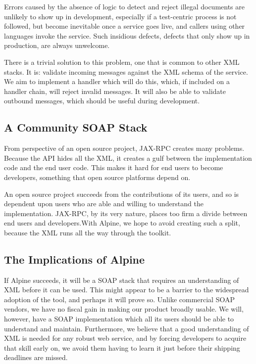 Errors caused by the absence of logic to detect and reject illegal
documents are unlikely to show up in development, especially if a
test-centric process is not followed, but become inevitable once a
service goes live, and callers using other languages invoke the
service. Such insidious defects, defects that only show up in
production, are always unwelcome.

There is a trivial solution to this problem, one that is common to
other XML stacks. It is: validate incoming messages against the XML
schema of the service.  We aim to implement a handler which will do
this, which, if included on a handler chain, will reject invalid
messages. It will also be able to validate outbound messages, which
should be useful during development. 

\subsection{A Community SOAP Stack}
\label{alpine:community}

From perspective of an open source project, JAX-RPC creates many
problems. Because the API hides all the XML, it creates a gulf between
the implementation code and the end user code. This makes it hard for
end users to become developers, something that open source platforms
depend on.

An open source project succeeds from the contributions of its users,
and so is dependent upon users who are able and willing to understand
the implementation. JAX-RPC, by its very nature, places too firm a
divide between end users and developers.With Alpine, we hope to avoid
creating such a split, because the XML runs all the way through the
toolkit.


\subsection{The Implications of Alpine}
\label{alpine:implications}

If Alpine succeeds, it will be a SOAP stack that requires an
understanding of XML before it can be used. This might appear to be a
barrier to the widespread adoption of the tool, and perhaps it will
prove so. Unlike commercial SOAP vendors, we have no fiscal gain in
making our product broadly usable. We will, however, have a SOAP
implementation which all its users should be able to understand and
maintain.  Furthermore, we believe that a good understanding of XML is
needed for any robust web service, and by forcing developers to
acquire that skill early on, we avoid them having to learn it just
before their shipping deadlines are missed.

